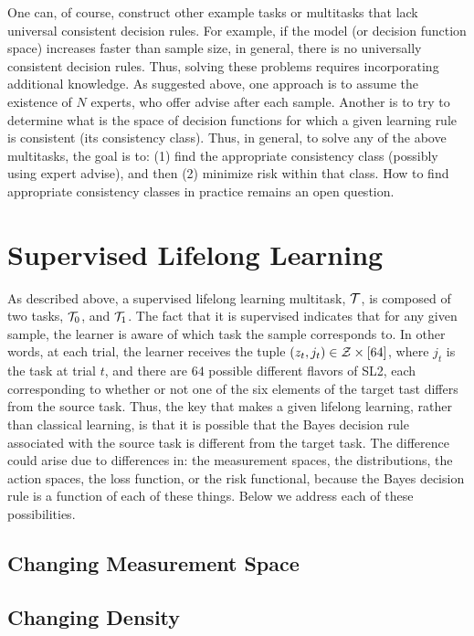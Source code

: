 \documentclass{article}
\begin{document}
One can, of course, construct other example tasks or multitasks that lack universal consistent decision rules.  For example, if the model (or decision function space) increases faster than sample size, in general, there is no universally consistent decision rules.  Thus, solving these problems requires incorporating additional knowledge.  As suggested above, one approach is to assume the existence of $N$ experts, who offer advise after each sample.  Another is to try to determine what is the space of decision functions for which a given learning rule is consistent (its consistency class). 
Thus, in general, to solve any of the above multitasks, the goal is to: (1) find the appropriate consistency class (possibly using expert advise), and then (2) minimize risk within that class.  How to find appropriate consistency classes  in practice remains an open question.


\section{Supervised Lifelong Learning}
\label{sec:transfer}

As described above,  a supervised lifelong learning multitask, $\mathcal{T}$, is composed of two tasks, $\mathcal{T}_0$, and $\mathcal{T}_1$.  The fact that it is supervised indicates that for any given sample, the learner is aware of which task the sample corresponds to.  In other words, at each trial, the learner receives the tuple $(z_t, j_t) \in \mathcal{Z} \times [64]$, where $j_t$ is the task at trial $t$, and there are $64$ possible different flavors of SL2, each corresponding to whether or not one of the six elements of the target tast differs from the source task.    
Thus, the key that makes a given lifelong learning, rather than classical learning, is that it is possible that the Bayes decision rule associated with the source task is different from the target task.  The difference could arise due to differences in: the measurement spaces, the distributions, the action spaces, the loss function, or the risk functional, because the Bayes decision rule is a function of each of these things.  Below we address each of these possibilities.

\subsection{Changing Measurement Space}




\subsection{Changing Density}
\end{document}
